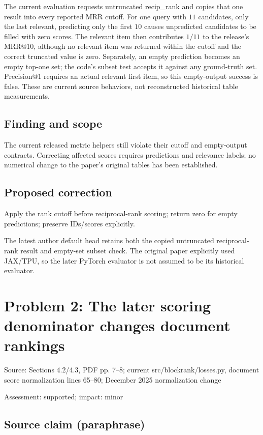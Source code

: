 \documentclass[11pt]{article}
\begin{document}
The current evaluation requests untruncated recip\_rank and copies that one result into every reported MRR cutoff. For one query with \(11\) candidates, only the last relevant, predicting only the first \(10\) causes unpredicted candidates to be filled with zero scores. The relevant item then contributes \(1/11\) to the release’s MRR@\(10\), although no relevant item was returned within the cutoff and the correct truncated value is zero. Separately, an empty prediction becomes an empty top-one set; the code’s subset test accepts it against any ground-truth set. Precision@\(1\) requires an actual relevant first item, so this empty-output success is false. These are current source behaviors, not reconstructed historical table measurements.

\subsection*{Finding and scope}

The current released metric helpers still violate their cutoff and empty-output contracts. Correcting affected scores requires predictions and relevance labels; no numerical change to the paper’s original tables has been established.

\subsection*{Proposed correction}

Apply the rank cutoff before reciprocal-rank scoring; return zero for empty predictions; preserve IDs/scores explicitly.

The latest author default head retains both the copied untruncated reciprocal-rank result and empty-set subset check. The original paper explicitly used JAX/TPU, so the later PyTorch evaluator is not assumed to be its historical evaluator.

\section*{Problem 2: The later scoring denominator changes document rankings}

Source: Sections 4.2/4.3, PDF pp. 7–8; current src/blockrank/losses.py, document score normalization lines 65–80; December 2025 normalization change

Assessment: supported; impact: minor

\subsection*{Source claim (paraphrase)}
\end{document}
